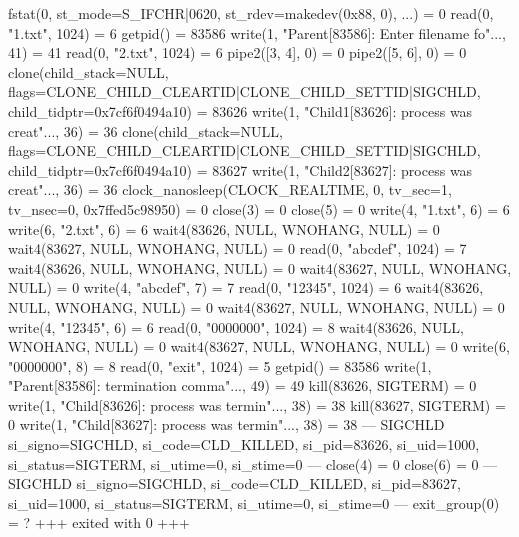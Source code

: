 \begin{breakableverbatim}
fstat(0, {st\_mode=S\_IFCHR|0620, st\_rdev=makedev(0x88, 0), ...}) = 0
read(0, "1.txt\n", 1024)                = 6
getpid()                                = 83586
write(1, "Parent[83586]: Enter filename fo"..., 41) = 41
read(0, "2.txt\n", 1024)                = 6
pipe2([3, 4], 0)                        = 0
pipe2([5, 6], 0)                        = 0
clone(child\_stack=NULL, flags=CLONE\_CHILD\_CLEARTID|CLONE\_CHILD\_SETTID|SIGCHLD, child\_tidptr=0x7cf6f0494a10) = 83626
write(1, "Child1[83626]: process was creat"..., 36) = 36
clone(child\_stack=NULL, flags=CLONE\_CHILD\_CLEARTID|CLONE\_CHILD\_SETTID|SIGCHLD, child\_tidptr=0x7cf6f0494a10) = 83627
write(1, "Child2[83627]: process was creat"..., 36) = 36
clock\_nanosleep(CLOCK\_REALTIME, 0, {tv\_sec=1, tv\_nsec=0}, 0x7ffed5c98950) = 0
close(3)                                = 0
close(5)                                = 0
write(4, "1.txt\n", 6)                  = 6
write(6, "2.txt\n", 6)                  = 6
wait4(83626, NULL, WNOHANG, NULL)       = 0
wait4(83627, NULL, WNOHANG, NULL)       = 0
read(0, "abcdef\n", 1024)               = 7
wait4(83626, NULL, WNOHANG, NULL)       = 0
wait4(83627, NULL, WNOHANG, NULL)       = 0
write(4, "abcdef\n", 7)                 = 7
read(0, "12345\n", 1024)                = 6
wait4(83626, NULL, WNOHANG, NULL)       = 0
wait4(83627, NULL, WNOHANG, NULL)       = 0
write(4, "12345\n", 6)                  = 6
read(0, "0000000\n", 1024)              = 8
wait4(83626, NULL, WNOHANG, NULL)       = 0
wait4(83627, NULL, WNOHANG, NULL)       = 0
write(6, "0000000\n", 8)                = 8
read(0, "exit\n", 1024)                 = 5
getpid()                                = 83586
write(1, "Parent[83586]: termination comma"..., 49) = 49
kill(83626, SIGTERM)                    = 0
write(1, "Child[83626]: process was termin"..., 38) = 38
kill(83627, SIGTERM)                    = 0
write(1, "Child[83627]: process was termin"..., 38) = 38
--- SIGCHLD {si\_signo=SIGCHLD, si\_code=CLD\_KILLED, si\_pid=83626, si\_uid=1000, si\_status=SIGTERM, si\_utime=0, si\_stime=0} ---
close(4)                                = 0
close(6)                                = 0
--- SIGCHLD {si\_signo=SIGCHLD, si\_code=CLD\_KILLED, si\_pid=83627, si\_uid=1000, si\_status=SIGTERM, si\_utime=0, si\_stime=0} ---
exit\_group(0)                           = ?
+++ exited with 0 +++
\end{breakableverbatim}
